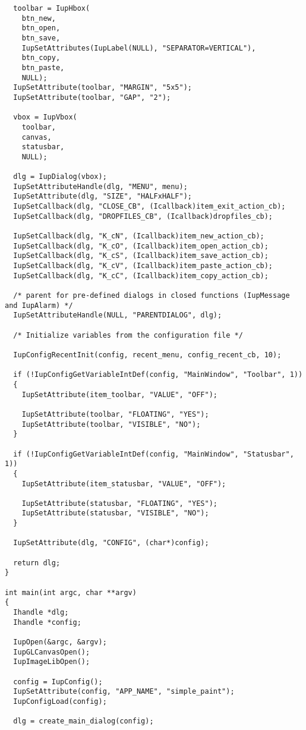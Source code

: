 \documentclass{ctexart}
\begin{document}
\begin{lstlisting}
  toolbar = IupHbox(
    btn_new,
    btn_open,
    btn_save,
    IupSetAttributes(IupLabel(NULL), "SEPARATOR=VERTICAL"),
    btn_copy,
    btn_paste,
    NULL);
  IupSetAttribute(toolbar, "MARGIN", "5x5");
  IupSetAttribute(toolbar, "GAP", "2");

  vbox = IupVbox(
    toolbar,
    canvas,
    statusbar,
    NULL);

  dlg = IupDialog(vbox);
  IupSetAttributeHandle(dlg, "MENU", menu);
  IupSetAttribute(dlg, "SIZE", "HALFxHALF");
  IupSetCallback(dlg, "CLOSE_CB", (Icallback)item_exit_action_cb);
  IupSetCallback(dlg, "DROPFILES_CB", (Icallback)dropfiles_cb);

  IupSetCallback(dlg, "K_cN", (Icallback)item_new_action_cb);
  IupSetCallback(dlg, "K_cO", (Icallback)item_open_action_cb);
  IupSetCallback(dlg, "K_cS", (Icallback)item_save_action_cb);
  IupSetCallback(dlg, "K_cV", (Icallback)item_paste_action_cb);
  IupSetCallback(dlg, "K_cC", (Icallback)item_copy_action_cb);

  /* parent for pre-defined dialogs in closed functions (IupMessage and IupAlarm) */
  IupSetAttributeHandle(NULL, "PARENTDIALOG", dlg);

  /* Initialize variables from the configuration file */

  IupConfigRecentInit(config, recent_menu, config_recent_cb, 10);

  if (!IupConfigGetVariableIntDef(config, "MainWindow", "Toolbar", 1))
  {
    IupSetAttribute(item_toolbar, "VALUE", "OFF");

    IupSetAttribute(toolbar, "FLOATING", "YES");
    IupSetAttribute(toolbar, "VISIBLE", "NO");
  }

  if (!IupConfigGetVariableIntDef(config, "MainWindow", "Statusbar", 1))
  {
    IupSetAttribute(item_statusbar, "VALUE", "OFF");

    IupSetAttribute(statusbar, "FLOATING", "YES");
    IupSetAttribute(statusbar, "VISIBLE", "NO");
  }

  IupSetAttribute(dlg, "CONFIG", (char*)config);

  return dlg;
}

int main(int argc, char **argv)
{
  Ihandle *dlg;
  Ihandle *config;

  IupOpen(&argc, &argv);
  IupGLCanvasOpen();
  IupImageLibOpen();

  config = IupConfig();
  IupSetAttribute(config, "APP_NAME", "simple_paint");
  IupConfigLoad(config);

  dlg = create_main_dialog(config);


\end{lstlisting}
\end{document}
